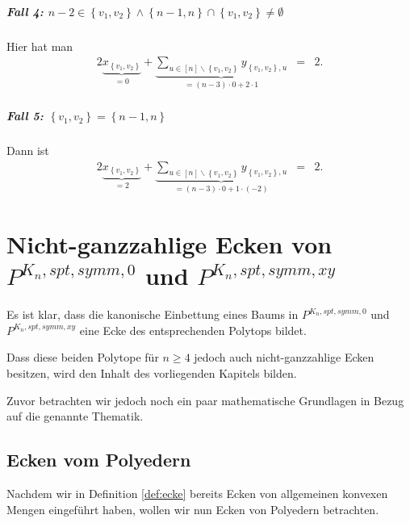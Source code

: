 \documentclass[10p,a4paper,BCOR = 12mm, DIV=15]{scrbook}
\begin{document}
\begin{bew}
\paragraph{Fall 4: $n-2 \in \left\{v_1, v_2\right\} \wedge \left\{n-1, n\right\} \cap \left\{v_1, v_2\right\} \neq \emptyset$} Hier hat man
\begin{eqnarray*}
2 \underbrace{x_{\left\{v_1, v_2\right\}}}_{= 0} + \underbrace{\sum_{u\in[n]\backslash\left\{v_1, v_2\right\}} y_{\left\{v_1, v_2\right\}, u}}_{= \left(n-3\right) \cdot 0 + 2\cdot 1} & = & 2.
\end{eqnarray*}

\paragraph{Fall 5: $\left\{v_1, v_2\right\} = \left\{n-1, n\right\}$} Dann ist
\begin{eqnarray*}
2 \underbrace{x_{\left\{v_1, v_2\right\}}}_{= 2} + \underbrace{\sum_{u\in[n]\backslash\left\{v_1, v_2\right\}} y_{\left\{v_1, v_2\right\}, u}}_{= \left(n-3\right) \cdot 0 + 1\cdot \left(-2\right)} & = & 2.
\end{eqnarray*}
\end{bew}

\chapter{Nicht-ganzzahlige Ecken von $P^{K_n, spt, symm, 0}$ und $P^{K_n, spt, symm, xy}$}

\label{chap:nichtganzz_ecken}

Es ist klar, dass die kanonische Einbettung eines Baums in $P^{K_n, spt, symm, 0}$ und $P^{K_n, spt, symm, xy}$ eine Ecke des entsprechenden Polytops bildet.

Dass diese beiden Polytope für $n\geq 4$ jedoch auch nicht-ganzzahlige Ecken besitzen, wird den Inhalt des vorliegenden Kapitels bilden.

Zuvor betrachten wir jedoch noch ein paar mathematische Grundlagen in Bezug auf die genannte Thematik.

\section{Ecken vom Polyedern}

\label{sec:ecken}

Nachdem wir in Definition \ref{def:ecke} bereits Ecken von allgemeinen konvexen Mengen eingeführt haben, wollen wir nun Ecken von Polyedern betrachten.
\end{document}
